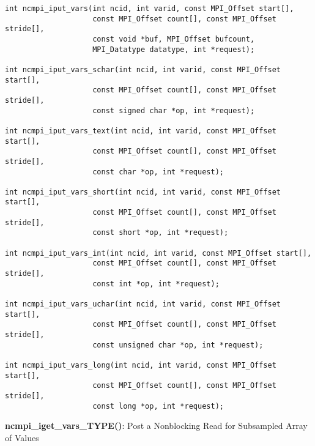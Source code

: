 \begin{verbatim}
int ncmpi_iput_vars(int ncid, int varid, const MPI_Offset start[],
                    const MPI_Offset count[], const MPI_Offset stride[],
                    const void *buf, MPI_Offset bufcount,
                    MPI_Datatype datatype, int *request); 

int ncmpi_iput_vars_schar(int ncid, int varid, const MPI_Offset start[],
                    const MPI_Offset count[], const MPI_Offset stride[],
                    const signed char *op, int *request); 

int ncmpi_iput_vars_text(int ncid, int varid, const MPI_Offset start[],
                    const MPI_Offset count[], const MPI_Offset stride[],
                    const char *op, int *request); 

int ncmpi_iput_vars_short(int ncid, int varid, const MPI_Offset start[],
                    const MPI_Offset count[], const MPI_Offset stride[],
                    const short *op, int *request); 

int ncmpi_iput_vars_int(int ncid, int varid, const MPI_Offset start[],
                    const MPI_Offset count[], const MPI_Offset stride[],
                    const int *op, int *request); 

int ncmpi_iput_vars_uchar(int ncid, int varid, const MPI_Offset start[],
                    const MPI_Offset count[], const MPI_Offset stride[],
                    const unsigned char *op, int *request);

int ncmpi_iput_vars_long(int ncid, int varid, const MPI_Offset start[],
                    const MPI_Offset count[], const MPI_Offset stride[],
                    const long *op, int *request);
\end{verbatim}


{\bf ncmpi\_iget\_vars\_TYPE()}: Post a Nonblocking Read for Subsampled Array of Values

